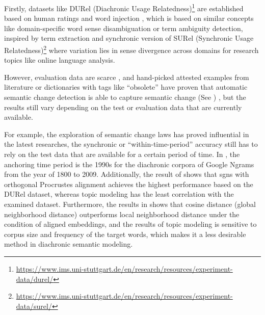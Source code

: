 Firstly, datasets like DURel (Diachronic Usage Relatedness)\footnote{\url{https://www.ims.uni-stuttgart.de/en/research/resources/experiment-data/durel/}} are established based on human ratings \parencite{schlechtweg2018diachronic} and word injection \parencite{schlechtweg2019wind}, which is based on similar concepts like domain-specific word sense disambiguation or term ambiguity detection, inspired by term extraction and synchronic version of SURel (Synchronic Usage Relatedness)\footnote{\url{https://www.ims.uni-stuttgart.de/en/research/resources/experiment-data/surel/}} where variation lies in sense divergence across domains for research topics like online language analysis.

However, evaluation data are scarce \parencite{wevers2020digital}, and hand-picked attested examples from literature or dictionaries with tags like ``obsolete'' \parencite{hamilton2016cultural} have proven that automatic semantic change detection is able to capture semantic change (See ) \parencite{schlechtweg2019wind}, but the results still vary depending on the test or evaluation data that are currently available.

For example, the exploration of semantic change laws has proved influential in the latest researches, the synchronic or ``within-time-period'' accuracy still has to rely on the test data that are available for a certain period of time. In \textcite{hamilton2016law}, the anchoring time period is the 1990s for the diachronic corpora of Google Ngrams from the year of 1800 to 2009. Additionally, the result of \textcite{schlechtweg2019wind} shows that \gls{sgns} with orthogonal Procrustes alignment achieves the highest performance based on the DURel dataset, whereas topic modeling has the least correlation with the examined dataset. Furthermore, the results in \textcite{schlechtweg2019wind, dubossarsky2017outta} shows that cosine distance (global neighborhood distance) outperforms local neighborhood distance under the condition of aligned embeddings, and the results of topic modeling is sensitive to corpus size and frequency of the target words, which makes it a less desirable method in diachronic semantic modeling.

